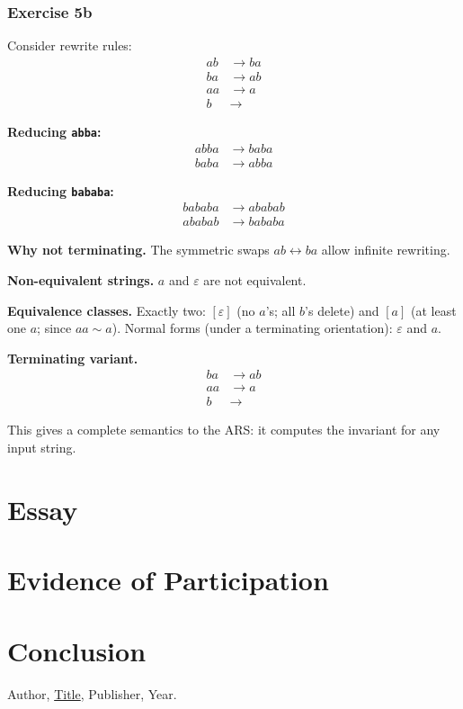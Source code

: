 \documentclass{article}
\theoremstyle{theorem}
\theoremstyle{definition}
\theoremstyle{remark}
\begin{document}
\subsubsection*{Exercise 5b}

Consider rewrite rules:
\begin{align*}
ab &\rightarrow ba \\
ba &\rightarrow ab \\
aa &\rightarrow a \\
b &\rightarrow
\end{align*}

\textbf{Reducing \texttt{abba}:}
\begin{align*}
abba &\rightarrow baba \\
baba &\rightarrow abba
\end{align*}

\textbf{Reducing \texttt{bababa}:}
\begin{align*}
bababa &\rightarrow ababab \\
ababab &\rightarrow bababa
\end{align*}

\textbf{Why not terminating.} The symmetric swaps $ab \leftrightarrow ba$ allow infinite rewriting.

\textbf{Non-equivalent strings.} $a$ and $\varepsilon$ are not equivalent.

\textbf{Equivalence classes.} Exactly two: $[\varepsilon]$ (no $a$'s; all $b$'s delete) and $[a]$ (at least one $a$; since $aa \sim a$).
Normal forms (under a terminating orientation): $\varepsilon$ and $a$.

\textbf{Terminating variant.}
\begin{align*}
ba &\rightarrow ab \\
aa &\rightarrow a \\
b &\rightarrow
\end{align*}


This gives a complete semantics to the ARS: it computes the invariant for any input string.

\section{Essay}

\section{Evidence of Participation}

\section{Conclusion}\label{conclusion}

\begin{thebibliography}{99}
 Author, \href{https://en.wikipedia.org/wiki/LaTeX}{Title}, Publisher, Year.
\end{thebibliography}
\end{document}
